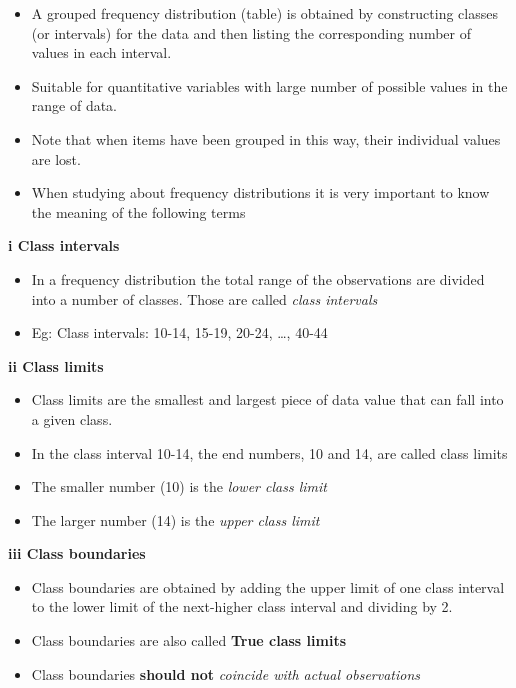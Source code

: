 \documentclass[]{book}
\providecommand{\tightlist}{%
  \setlength{\itemsep}{0pt}\setlength{\parskip}{0pt}}
\begin{document}
\begin{itemize}
\tightlist
\item
  A grouped frequency distribution (table) is obtained by constructing classes (or intervals) for the data and then listing the corresponding number of values in each interval.
\item
  Suitable for quantitative variables with large number of possible values in the range of data.
\item
  Note that when items have been grouped in this way, their individual values are lost.
\item
  When studying about frequency distributions it is very important to know the meaning of the following terms
\end{itemize}

\textbf{i Class intervals}

\begin{itemize}
\tightlist
\item
  In a frequency distribution the total range of the observations are divided into a number of classes. Those are called \emph{class intervals}
\item
  Eg: Class intervals: 10-14, 15-19, 20-24, \ldots{}, 40-44
\end{itemize}

\textbf{ii Class limits}

\begin{itemize}
\tightlist
\item
  Class limits are the smallest and largest piece of data value that can fall into a given class.
\item
  In the class interval 10-14, the end numbers, 10 and 14, are called class limits
\item
  The smaller number (10) is the \emph{lower class limit}
\item
  The larger number (14) is the \emph{upper class limit}
\end{itemize}

\textbf{iii Class boundaries}

\begin{itemize}
\tightlist
\item
  Class boundaries are obtained by adding the upper limit of one class interval to the lower limit of the next-higher class interval and dividing by 2.
\item
  Class boundaries are also called \textbf{True class limits}
\item
  Class boundaries \textbf{should not} \emph{coincide with actual observations}
\end{itemize}
\end{document}
